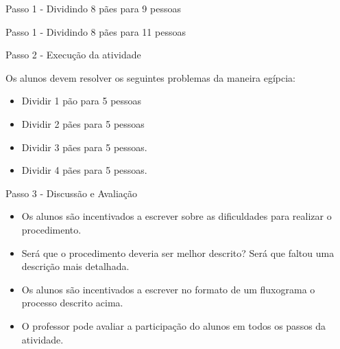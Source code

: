 \documentclass{beamer}
\begin{document}
\begin{frame}{Passo 1 - Dividindo 8 pães para 9 pessoas}


\end{frame}

\begin{frame}{Passo 1 - Dividindo 8 pães para 11 pessoas}


\end{frame}


\begin{frame}{Passo 2 - Execução da atividade}

Os alunos devem resolver os seguintes problemas da maneira egípcia:

\begin{itemize}

\item Dividir 1 pão para 5 pessoas
\item Dividir 2 pães para 5 pessoas
\item Dividir 3 pães para 5 pessoas.
\item Dividir 4 pães para 5 pessoas.

\end{itemize}


\end{frame}






\begin{frame}{Passo 3 - Discussão e Avaliação}

\begin{itemize}

\item<1-> Os alunos são incentivados a escrever sobre as dificuldades para realizar o procedimento.

\item<2-> Será que o procedimento deveria ser melhor descrito? Será que faltou uma descrição mais detalhada.

\item <3-> Os alunos são incentivados a escrever no formato de um fluxograma o processo descrito acima.

\item<4-> O professor pode avaliar a participação do alunos em todos os passos da atividade.

\end{itemize}


\end{frame}
\end{document}
